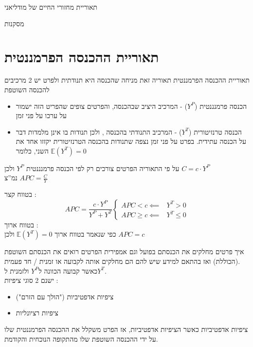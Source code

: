 \documentclass[usenames,dvipsnames]{beamer}
\begin{document}
\begin{RTL}
\begin{frame}[allowframebreaks]{תאוריית מחזורי החיים של מודליאני}
\begin{exampleblock}{מסקנות}
\end{exampleblock}
\end{frame}

\section{תאוריית ההכנסה הפרמננטית}
\begin{frame}[allowframebreaks]{תאוריית ההכנסה הפרמננטית}
    תאוריה זאת מניחה שהכנסה היא תנודתית ולפרט יש 2 מרכיבים להכנסה השוטפת
    \begin{itemize}
        \item הכנסה פרמנננטית ($Y^{P}$) - המרכיב היציב שבהכנסה, והפרטים צופים שהפריט הזה ישמור על ערכו על פני זמן
        \item הכנסה טרנזיטורית ($Y^T$) - המרכיב התנודתי בהכנסה , ולכן תנודות בו אינן מלמדות דבר על הכנסה עתידית. בפרט על פני זמן נצפה שתנודות בהכנסה הטרנזיטורית יקזזו אחד את השני, כלומר $\mathbb{E}(Y^T)=0$
    \end{itemize}
    על פי התאוריה הפרטים צורכים רק לפי הכנסה פרמנננטית $Y^{P}$ ולכן $C = c\cdot Y^P$ \\
     נמ''צ  $APC = \frac{C}{Y}$

     \framebreak
     בטווח קצר :
     \begin{equation*}
        APC = \frac{c\cdot Y ^P}{Y^P + Y^T}
        \begin{cases}
            APC < c \impliedby &  Y^T > 0 \\
            APC \geq c  \impliedby & Y^T \leq 0 
        \end{cases}
     \end{equation*}
     בטווח ארוך : \\
     כפי שנאמר בטווח ארוך $\mathbb{E}(Y^T) = 0$ ולכן $APC = c$

     \framebreak

    \begin{block}{איך פרטים מחלקים את הכנסתם}
        בפועל וגם אמפירית הפרטים רואים את הכנסתם השוטפת (הכוללת) ואז בהתאם למידע שיש להם הם מחלקים אותה לקבועה או זמנית / חד פעמית. \\

        כאשר קבועה הכוונה ל$Y^P$ ולזמנית ל$Y^T$. \\ 
        ישנם 2 סוגי ציפיות :
        \begin{itemize}
            \item ציפיות אדפטיביות ("הולך עם הזרם") 
            \item ציפיות רציונליות
        \end{itemize}
    \end{block}
    \framebreak
    \begin{block}{ציפיות אדפטיביות}
        כאשר הציפיות אדפטיביות, אז הפרט משקלל את ההכנסה הפרמננטית שלו על ידי ההכנסה השוטפת שלו מהתקופה הנוכחית והקודמת.
        

\end{block}
\end{frame}
\end{RTL}
\end{document}
